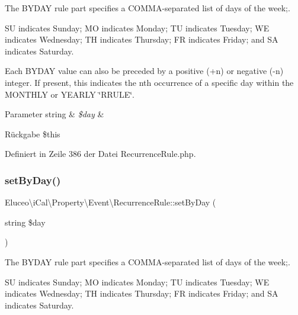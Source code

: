 The B\+Y\+D\+AY rule part specifies a C\+O\+M\+M\+A-\/separated list of days of the week;.

SU indicates Sunday; MO indicates Monday; TU indicates Tuesday; WE indicates Wednesday; TH indicates Thursday; FR indicates Friday; and SA indicates Saturday.

Each B\+Y\+D\+AY value can also be preceded by a positive (+n) or negative (-\/n) integer. If present, this indicates the nth occurrence of a specific day within the M\+O\+N\+T\+H\+LY or Y\+E\+A\+R\+LY \char`\"{}\+R\+R\+U\+L\+E\char`\"{}.


\begin{DoxyParams}[1]{Parameter}
string & {\em \$day} & \\
\hline
\end{DoxyParams}
\begin{DoxyReturn}{Rückgabe}
\$this 
\end{DoxyReturn}


Definiert in Zeile 386 der Datei Recurrence\+Rule.\+php.

\mbox{\label{class_eluceo_1_1i_cal_1_1_property_1_1_event_1_1_recurrence_rule_abdbd6172cc8c72e3136d183d3009e78d}} 
\subsubsection{\texorpdfstring{set\+By\+Day()}{setByDay()}\hspace{0.1cm}{\footnotesize\ttfamily [3/3]}}
{\footnotesize\ttfamily Eluceo\textbackslash{}i\+Cal\textbackslash{}\+Property\textbackslash{}\+Event\textbackslash{}\+Recurrence\+Rule\+::set\+By\+Day (\begin{DoxyParamCaption}\item[{string}]{\$day }\end{DoxyParamCaption})}

The B\+Y\+D\+AY rule part specifies a C\+O\+M\+M\+A-\/separated list of days of the week;.

SU indicates Sunday; MO indicates Monday; TU indicates Tuesday; WE indicates Wednesday; TH indicates Thursday; FR indicates Friday; and SA indicates Saturday.

